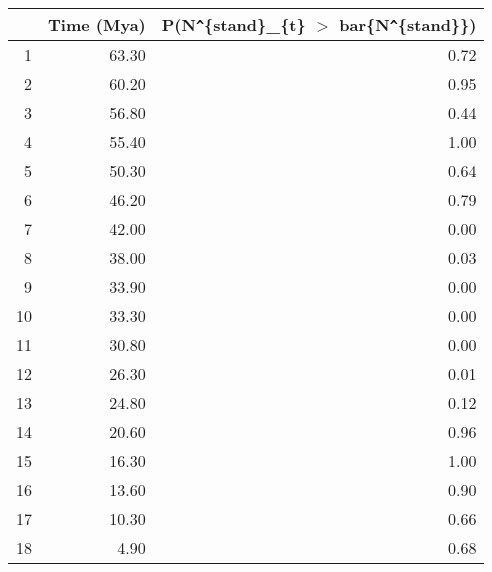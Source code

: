 \begin{table}[ht]
\centering
\begin{tabular}{rrr}
  \hline
 & Time (Mya) & P(N\verb|^|\{stand\}\_\{t\} $>$ bar\{N\verb|^|\{stand\}\}) \\ 
  \hline
1 & 63.30 & 0.72 \\ 
  2 & 60.20 & 0.95 \\ 
  3 & 56.80 & 0.44 \\ 
  4 & 55.40 & 1.00 \\ 
  5 & 50.30 & 0.64 \\ 
  6 & 46.20 & 0.79 \\ 
  7 & 42.00 & 0.00 \\ 
  8 & 38.00 & 0.03 \\ 
  9 & 33.90 & 0.00 \\ 
  10 & 33.30 & 0.00 \\ 
  11 & 30.80 & 0.00 \\ 
  12 & 26.30 & 0.01 \\ 
  13 & 24.80 & 0.12 \\ 
  14 & 20.60 & 0.96 \\ 
  15 & 16.30 & 1.00 \\ 
  16 & 13.60 & 0.90 \\ 
  17 & 10.30 & 0.66 \\ 
  18 & 4.90 & 0.68 \\ 
   \hline
\end{tabular}
\label{tab:div_peak}
\end{table}
